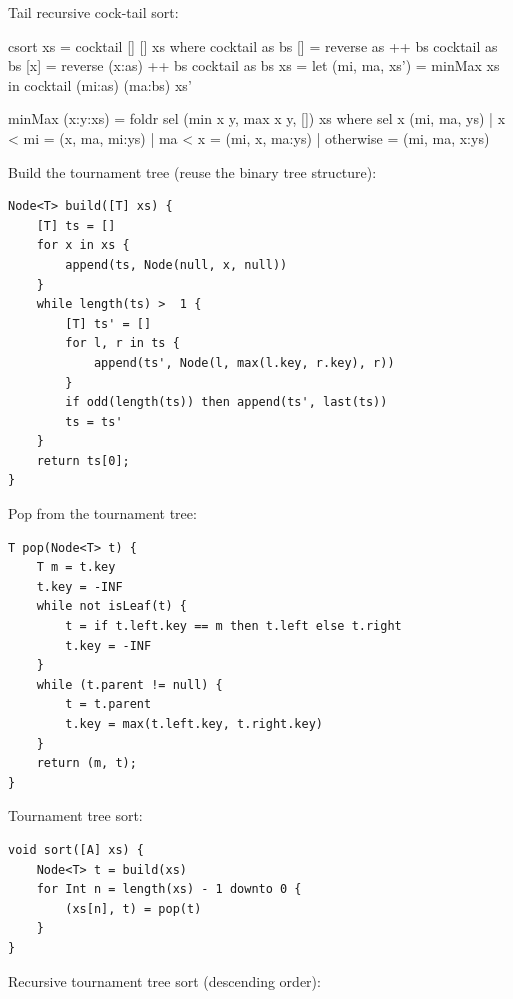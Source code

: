\documentclass[b5paper]{article}
\begin{document}
Tail recursive cock-tail sort:

\begin{Haskell}
csort xs = cocktail [] [] xs
  where
    cocktail as bs []  = reverse as ++ bs
    cocktail as bs [x] = reverse (x:as) ++ bs
    cocktail as bs xs  = let (mi, ma, xs') = minMax xs
                         in cocktail (mi:as) (ma:bs) xs'

minMax (x:y:xs) = foldr sel (min x y, max x y, []) xs
  where
    sel x (mi, ma, ys) | x < mi = (x, ma, mi:ys)
                       | ma < x = (mi, x, ma:ys)
                       | otherwise = (mi, ma, x:ys)
\end{Haskell}

Build the tournament tree (reuse the binary tree structure):

\begin{lstlisting}[language = Bourbaki]
Node<T> build([T] xs) {
    [T] ts = []
    for x in xs {
        append(ts, Node(null, x, null))
    }
    while length(ts) >  1 {
        [T] ts' = []
        for l, r in ts {
            append(ts', Node(l, max(l.key, r.key), r))
        }
        if odd(length(ts)) then append(ts', last(ts))
        ts = ts'
    }
    return ts[0];
}
\end{lstlisting}

Pop from the tournament tree:

\begin{lstlisting}[language = Bourbaki]
T pop(Node<T> t) {
    T m = t.key
    t.key = -INF
    while not isLeaf(t) {
        t = if t.left.key == m then t.left else t.right
        t.key = -INF
    }
    while (t.parent != null) {
        t = t.parent
        t.key = max(t.left.key, t.right.key)
    }
    return (m, t);
}
\end{lstlisting}

Tournament tree sort:

\begin{lstlisting}[language = Bourbaki]
void sort([A] xs) {
    Node<T> t = build(xs)
    for Int n = length(xs) - 1 downto 0 {
        (xs[n], t) = pop(t)
    }
}
\end{lstlisting}

Recursive tournament tree sort (descending order):
\end{document}
